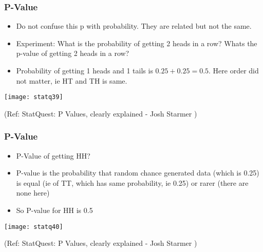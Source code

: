\begin{frame}[fragile]\frametitle{P-Value}


	\begin{itemize}

	\item Do not confuse this p with probability. They are related but not the same.
	\item Experiment: What is the probability of getting 2 heads in a row? Whats the p-value of getting 2 heads in a row?
	\item Probability of getting 1 heads and 1 tails is $0.25 + 0.25 = 0.5$. Here order did not matter, ie HT and TH is same.
	
	\end{itemize}


      \begin{center}
      \texttt{[image: statq39]}
	  	\end{center}

  
 
\tiny{(Ref: StatQuest: P Values, clearly explained - Josh Starmer )}
\end{frame}

\begin{frame}[fragile]\frametitle{P-Value}

\begin{itemize}

	\item P-Value of getting HH?
	\item P-value is the probability that random chance generated data (which is 0.25) is equal (ie of TT, which has same probability, ie 0.25) or rarer (there are none here)
	\item So P-value for HH is 0.5
	
	\end{itemize}

      \begin{center}
      \texttt{[image: statq40]}
	  	\end{center}

  
  
 
\tiny{(Ref: StatQuest: P Values, clearly explained - Josh Starmer )}
\end{frame}


